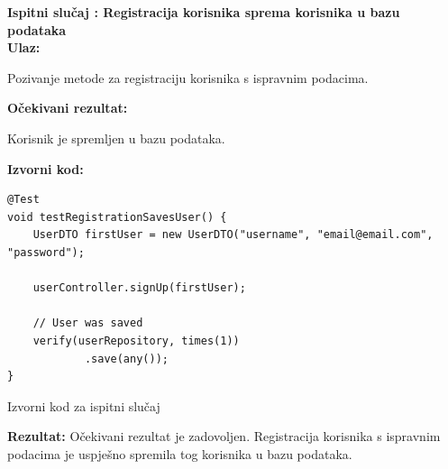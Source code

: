 			\noindent \textbf{Ispitni slučaj \thetestcase: Registracija korisnika sprema korisnika u bazu podataka} \\
			\noindent \textbf{Ulaz:}
			\begin{packed_enum}
				\item Pozivanje metode za registraciju korisnika s ispravnim podacima.
			\end{packed_enum}
			\noindent \textbf{Očekivani rezultat:}
			\begin{packed_enum}
				\item[1.a] Korisnik je spremljen u bazu podataka.
			\end{packed_enum}
			\noindent \textbf{Izvorni kod:}
			\begin{listing}[H]
\begin{verbatim}
@Test
void testRegistrationSavesUser() {
    UserDTO firstUser = new UserDTO("username", "email@email.com", "password");

    userController.signUp(firstUser);

    // User was saved
    verify(userRepository, times(1))
            .save(any());
}
\end{verbatim}
				\caption{Izvorni kod za ispitni slučaj \thetestcase}
				\label{unittestcase1}
			\end{listing}
			\noindent \textbf{Rezultat:} Očekivani rezultat je zadovoljen. Registracija korisnika s ispravnim podacima je uspješno spremila tog korisnika u bazu podataka. 
			\clearpage

